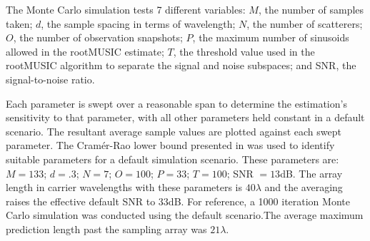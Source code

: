 \documentclass{allertonproc}
\begin{document}
The Monte Carlo simulation tests 7 different variables: $M$, the number of samples taken; $d$, the sample spacing in terms of wavelength; $N$, the number of scatterers; $O$, the number of observation snapshots; $P$, the maximum number of sinusoids allowed in the rootMUSIC estimate; $T$, the threshold value used in the rootMUSIC algorithm to separate the signal and noise subspaces; and SNR, the signal-to-noise ratio.

Each parameter is swept over a reasonable span to determine the estimation's sensitivity to that parameter, with all other parameters held constant in a default scenario. The resultant average sample values are plotted against each swept parameter. The Cram\'er-Rao lower bound presented in \cite{kckpVTC2015} was used to identify suitable parameters for a default simulation scenario. These parameters are: $M = 133$; $d = .3$; $N = 7$; $O = 100$; $P = 33$; $T = 100$; SNR $= 13$dB. The array length in carrier wavelengths with these parameters is $40\lambda$ and the averaging raises the effective default SNR to $33$dB. For reference, a 1000 iteration Monte Carlo simulation was conducted using the default scenario.The average maximum prediction length past the sampling array was $21\lambda$.

\end{document}
